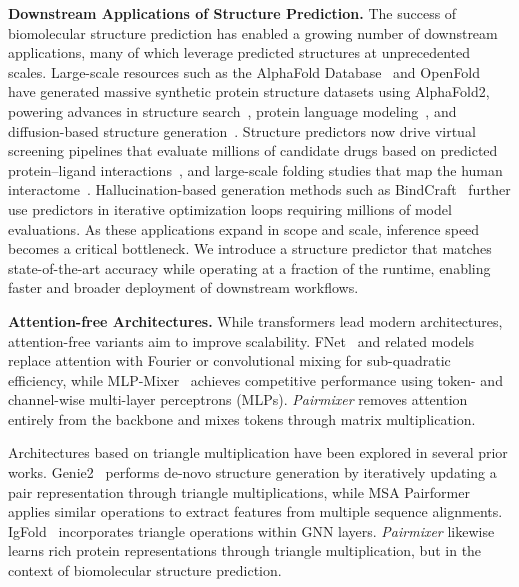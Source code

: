 \documentclass{article} %
\renewcommand{\paragraph}[1]{\vspace{1.25mm}\noindent\textbf{#1}}
\def\name{{\textit{Pairmixer}}\xspace}
\begin{document}
\paragraph{Downstream Applications of Structure Prediction. }
The success of biomolecular structure prediction has enabled a growing number of downstream applications, many of which leverage predicted structures at unprecedented scales.
Large-scale resources such as the AlphaFold Database~\citep{varadi2022alphafold} and OpenFold~\citep{ahdritz2024openfold} have generated massive synthetic protein structure datasets using AlphaFold2, powering advances in structure search~\citep{van2024foldseek}, protein language modeling~\citep{prott5,ouyang2024distilling,hayes2025simulating}, and diffusion-based structure generation~\citep{geffner2025proteina,lin2024genie2,daras2025ambient}.
Structure predictors now drive virtual screening pipelines that evaluate millions of candidate drugs based on predicted protein–ligand interactions~\citep{wong2022benchmarking,shamir2025state,scardino2023good}, and large-scale folding studies that map the human interactome~\citep{ille2025human,zhang2025predicting}.
Hallucination-based generation methods such as BindCraft~\citep{pacesa2025bindcraft} further use predictors in iterative optimization loops requiring millions of model evaluations.
As these applications expand in scope and scale, inference speed becomes a critical bottleneck.
We introduce a structure predictor that matches state-of-the-art accuracy while operating at a fraction of the runtime, enabling faster and broader deployment of downstream workflows.




\paragraph{Attention-free Architectures. }
While transformers lead modern architectures, attention-free variants aim to improve scalability.
FNet~\citep{lee2021fnet} and related models~\citep{poli2023hyena,zhai2021attnfree} replace attention with Fourier or convolutional mixing for sub-quadratic efficiency, while MLP-Mixer~\citep{tolstikhin2021mlp} achieves competitive performance using token- and channel-wise multi-layer perceptrons (MLPs).
\name removes attention entirely from the backbone and mixes tokens through matrix multiplication.

Architectures based on triangle multiplication have been explored in several prior works.
Genie2~\citep{lin2024genie2} performs de-novo structure generation by iteratively updating a pair representation through triangle multiplications, while MSA Pairformer~\citep{akiyama2025scaling} applies similar operations to extract features from multiple sequence alignments.
IgFold~\citep{ruffolo2023fast} incorporates triangle operations within GNN layers.
\name likewise learns rich protein representations through triangle multiplication, but in the context of biomolecular structure prediction.
\end{document}
